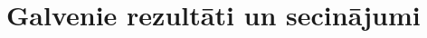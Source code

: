 \documentclass[12pt]{report}
\begin{document}
\chapter{Galvenie rezultāti un secinājumi} \label{chap:Secinajumi}


\nocite{SySML}





%
%
%
%
%
\end{document}
